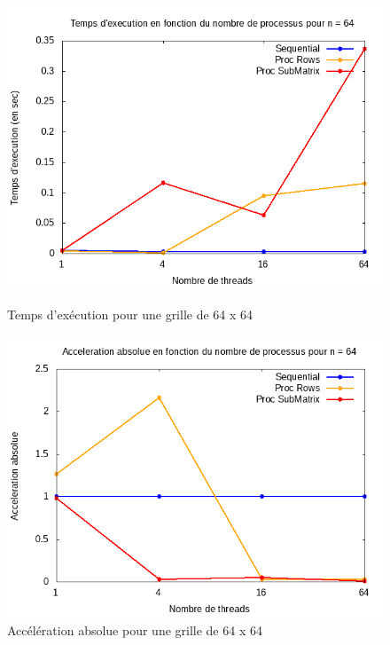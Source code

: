 \documentclass[10pt,a4paper]{article}
\begin{document}
\begin{figure}[h]
  \centering
  \begin{minipage}[b]{0.49\textwidth}
	\includegraphics[width=\textwidth]{./Time/size_64_time.png}
    \caption{Temps d'exécution pour une grille de 64 x 64}
  \end{minipage}
  \hfill
  \begin{minipage}[b]{0.49\textwidth}
    \includegraphics[width=\textwidth]{./Time/size_64_acceleration.png}
    \caption{Accélération absolue pour une grille de 64 x 64}
  \end{minipage}
\end{figure}
\end{document}
